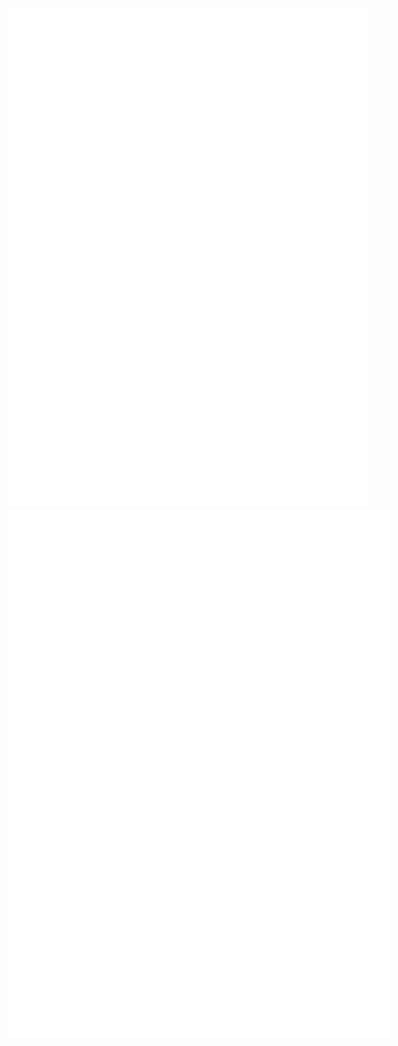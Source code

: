 \begin{figure}
\centering
\includegraphics[width=0.85\textwidth]{Figs/nota}
\includegraphics[width=0.9\textwidth,draft]{Figs/nota}
\end{figure}

